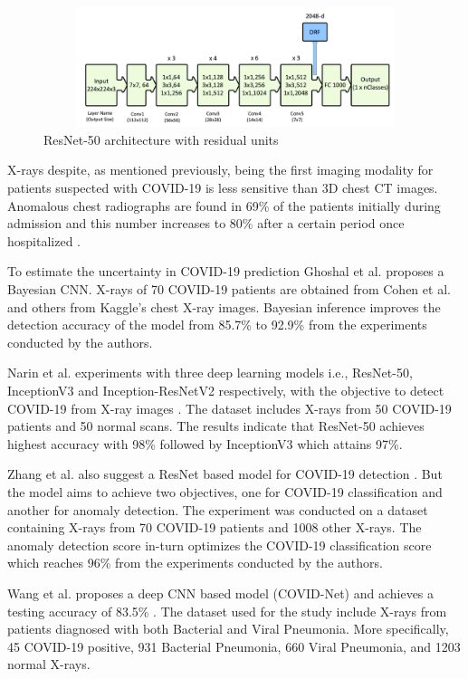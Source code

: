 \begin{figure}[H]
    \centering
    \includegraphics[width=15cm, height=3.5cm]{Images/ResNet.png}
    \caption[ResNet-50 Architecture]{ResNet-50 architecture with residual units \cite{MOB+2020}}
    \label{fig:ResNet-50 Architecture}
    \end{figure}
\vspace{-2em}
X-rays despite, as mentioned previously, being the first imaging modality for 
patients suspected with COVID-19 is less sensitive than 3D chest CT images. 
Anomalous chest radiographs are found in 69\% of the patients initially during 
admission and this number increases to 80\% after a certain period 
once hospitalized \cite{WLA+2020}.

To estimate the uncertainty in COVID-19 prediction Ghoshal et al. \cite{GHT2020} proposes 
a Bayesian CNN. X-rays of 70 COVID-19 patients are obtained 
from Cohen et al. \cite{JMD2020} and others from Kaggle's chest X-ray images. Bayesian 
inference improves the detection accuracy of the model from 85.7\% to 92.9\% from 
the experiments conducted by the authors.

Narin et al. experiments with three deep learning models 
i.e., ResNet-50, InceptionV3 and Inception-ResNetV2 respectively, with the objective 
to detect COVID-19 from X-ray images  \cite{AKP2020}. The dataset includes X-rays from 50 COVID-19 patients and 50 normal scans.
 The results indicate that ResNet-50 achieves highest accuracy with 98\% followed by InceptionV3 which 
attains 97\%.

Zhang et al. also suggest a ResNet based model for COVID-19 detection \cite{ZXS+2020}. 
But the model aims to achieve two objectives, one for COVID-19 classification and another for anomaly detection. The experiment was conducted on a dataset containing X-rays from 
70 COVID-19 patients and 1008 other X-rays. The anomaly detection score in-turn optimizes the COVID-19 
classification score which reaches 96\% from the experiments conducted by the authors.

Wang et al. proposes a deep CNN based model (COVID-Net) and
achieves a testing accuracy of 83.5\%  \cite{LWA2020}. The dataset used for the study include X-rays from 
patients diagnosed with both Bacterial and Viral Pneumonia. More specifically, 
45 COVID-19 positive, 931 Bacterial Pneumonia, 660 Viral Pneumonia, and 1203 normal X-rays.

